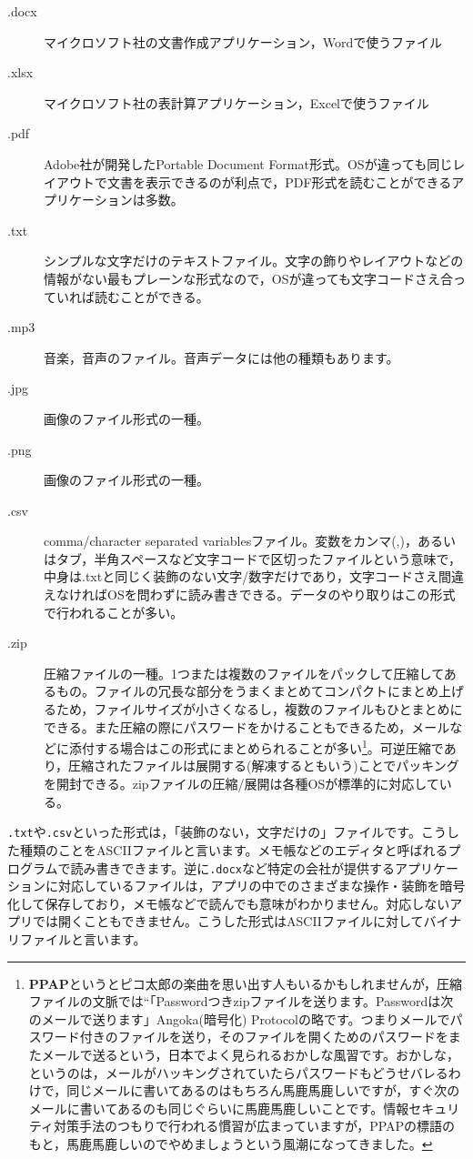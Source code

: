 \documentclass{ltjsbook}
\begin{document}
\begin{description}
    \item[.docx] マイクロソフト社の文書作成アプリケーション，Wordで使うファイル
    \item[.xlsx] マイクロソフト社の表計算アプリケーション，Excelで使うファイル
    \item[.pdf]  Adobe社が開発したPortable Document Format形式。OSが違っても同じレイアウトで文書を表示できるのが利点で，PDF形式を読むことができるアプリケーションは多数。
    \item[.txt] シンプルな文字だけのテキストファイル。文字の飾りやレイアウトなどの情報がない最もプレーンな形式なので，OSが違っても文字コードさえ合っていれば読むことができる。
    \item[.mp3] 音楽，音声のファイル。音声データには他の種類もあります。
    \item[.jpg] 画像のファイル形式の一種。
    \item[.png] 画像のファイル形式の一種。
    \item[.csv]  comma/character separated variablesファイル。変数をカンマ(,)，あるいはタブ，半角スペースなど文字コードで区切ったファイルという意味で，中身は.txtと同じく装飾のない文字/数字だけであり，文字コードさえ間違えなければOSを問わずに読み書きできる。データのやり取りはこの形式で行われることが多い。
    \item[.zip] 圧縮ファイルの一種。1つまたは複数のファイルをパックして圧縮してあるもの。ファイルの冗長な部分をうまくまとめてコンパクトにまとめ上げるため，ファイルサイズが小さくなるし，複数のファイルもひとまとめにできる。また圧縮の際にパスワードをかけることもできるため，メールなどに添付する場合はこの形式にまとめられることが多い\footnote{\textbf{PPAP}というとピコ太郎の楽曲を思い出す人もいるかもしれませんが，圧縮ファイルの文脈では``「Passwordつきzipファイルを送ります。Passwordは次のメールで送ります」Angoka(暗号化) Protocolの略です。つまりメールでパスワード付きのファイルを送り，そのファイルを開くためのパスワードをまたメールで送るという，日本でよく見られるおかしな風習です。おかしな，というのは，メールがハッキングされていたらパスワードもどうせバレるわけで，同じメールに書いてあるのはもちろん馬鹿馬鹿しいですが，すぐ次のメールに書いてあるのも同じぐらいに馬鹿馬鹿しいことです。情報セキュリティ対策手法のつもりで行われる慣習が広まっていますが，PPAPの標語のもと，馬鹿馬鹿しいのでやめましょうという風潮になってきました。}。可逆圧縮であり，圧縮されたファイルは展開する(解凍するともいう)ことでパッキングを開封できる。zipファイルの圧縮/展開は各種OSが標準的に対応している。
\end{description}
\texttt{.txt}や\texttt{.csv}といった形式は，「装飾のない，文字だけの」ファイルです。こうした種類のことをASCIIファイルと言います。メモ帳などのエディタと呼ばれるプログラムで読み書きできます。逆に\texttt{.docx}など特定の会社が提供するアプリケーションに対応しているファイルは，アプリの中でのさまざまな操作・装飾を暗号化して保存しており，メモ帳などで読んでも意味がわかりません。対応しないアプリでは開くこともできません。こうした形式はASCIIファイルに対してバイナリファイルと言います。
\end{document}
